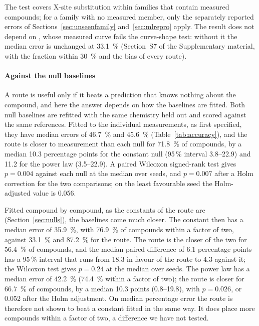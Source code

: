 The test covers X-site substitution within families that contain measured compounds; for a family
with no measured member, only the separately reported errors of Sections~\ref{sec:unseenfamily}
and~\ref{sec:mlrepro} apply. The result does not depend on , whose measured curve fails
the curve-shape test: without it the median error is unchanged at \SI{33.1}{\percent}
(Section~S7 of the Supplementary material, with the fraction within \SI{30}{\percent} and the bias
of every route).

\paragraph{Against the null baselines}
\label{sec:vsnulls}
A route is useful only if it beats a prediction that knows nothing about the compound, and here the
answer depends on how the baselines are fitted. Both null baselines are refitted with the same
chemistry held out and scored against the same references. Fitted to the individual measurements,
as first specified, they have median errors of \SI{46.7}{\percent} and \SI{45.6}{\percent}
(Table~\ref{tab:accuracy}), and the route is closer to measurement than each null for
\SI{71.8}{\percent} of compounds, by a median \num{10.3}
percentage points for the constant null (95\,\% interval \numrange{3.8}{22.9}) and \num{11.2} for
the power law (\numrange{3.5}{22.9}). A paired Wilcoxon signed-rank test gives $p=\num{0.004}$
against each null at the median over seeds, and $p=\num{0.007}$ after a Holm correction for the two
comparisons; on the least favourable seed the Holm-adjusted value is \num{0.056}.

Fitted compound by compound, as the constants of the route are (Section~\ref{sec:nulls}), the
baselines come much closer. The constant then has a median error of \SI{35.9}{\percent}, with
\SI{76.9}{\percent} of compounds within a factor of two, against \SI{33.1}{\percent} and
\SI{87.2}{\percent} for the route. The route is the closer of the two for \SI{56.4}{\percent} of
compounds, and the median paired difference of \num{6.1} percentage points has a 95\,\% interval
that runs from \num{18.3} in favour of the route to \num{4.3} against it; the Wilcoxon test gives
$p=\num{0.24}$ at the median over seeds. The power law has a median error of \SI{42.2}{\percent}
(\SI{74.4}{\percent} within a factor of two); the route is closer for \SI{66.7}{\percent} of
compounds, by a median \num{10.3} points (\numrange{0.8}{19.8}), with $p=\num{0.026}$, or
\num{0.052} after the Holm adjustment. On median percentage error the route is therefore not shown
to beat a constant fitted in the same way. It does place more compounds within a factor of two, a
difference we have not tested.

